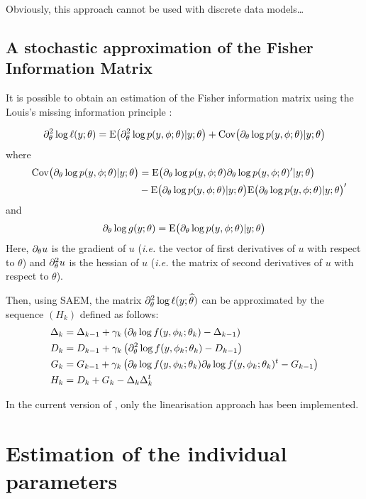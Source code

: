  Obviously, this approach cannot be used with discrete data models\ldots

\subsection{A stochastic approximation of the Fisher Information Matrix}
It is possible to obtain an estimation of the Fisher information matrix using the Louis's missing information principle \cite{Louis82}:

\begin{equation}\label{louis}
\partial^2_\theta \log \ell(y;\theta) = \mathrm{E}\big(\partial^2_\theta \log p(y,{\phi}; \theta) | y ; \theta \big) +
\mathrm{Cov}\big(\partial_\theta \log p(y,{\phi};\theta)| y ; \theta \big)
\end{equation}
where
\begin{align*} \quad
\mathrm{Cov}\big(\partial_\theta \log p(y,{\phi};\theta)| y ; \theta \big) &=
\mathrm{E} \big(\partial_\theta \log p(y,{\phi}; \theta) \partial_\theta \log p(y,{\phi}; \theta)^\prime |y ; \theta \big)  \\
& -
\mathrm{E} \big( \partial_\theta \log p(y,{\phi}; \theta) |y ; \theta \big)\mathrm{E} \big( \partial_\theta \log p(y,{\phi}; \theta) |y ; \theta \big)^\prime
\end{align*}
and
$$\partial_\theta \log g(y;\theta) = \mathrm{E} \big( \partial_\theta \log p(y,{\phi}; \theta) |y ; \theta \big)$$
Here, $\partial_\theta u$ is the gradient of $u$ ({\it i.e.} the vector of first derivatives of $u$ with respect to $\theta$) and  $\partial^2_\theta u$ is the hessian of $u$ ({\it i.e.} the matrix of second derivatives of $u$ with respect to $\theta$).

Then, using SAEM, the matrix $\partial^2_\theta \log \ell (y;{\widehat{\theta}})$ can be approximated by the sequence $(H_k)$ defined as follows:
\begin{align*}
\Delta_k&=\Delta_{k-1}+\gamma_k\left(\partial_{\theta}\log
f(y,\phi_k;\theta_k)-\Delta_{k-1}\right)\\
D_k  &=   D_{k-1}   +   \gamma_k  \left( \partial^2_\theta \log  f (y,  \phi_k;
    \theta_k)   - D_{k-1} \right) \\
G_k  &=   G_{k-1}   +   \gamma_k  \left(  \partial_\theta \log f(y, \phi_k; \theta_k) \partial_\theta \log f(y, \phi_k; \theta_k)^t - G_{k-1} \right) \\
H_{k} &= D_k + G_k - \Delta_k \Delta_k^t
\end{align*}

In the current version of \monolix, only the linearisation approach has been implemented.

\section{Estimation of the individual parameters} \label{section_indivparam}

